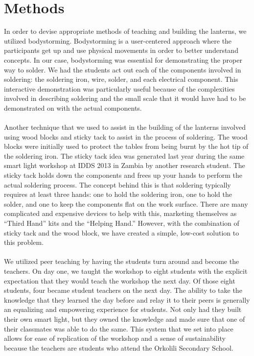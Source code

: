 \documentclass[11pt, twocolumn]{article}
\begin{document}
\section*{Methods}
In order to devise appropriate methods of teaching and building the lanterns, we utilized bodystorming. Bodystorming is a user-centered approach where the participants get up and use physical movements in order to better understand concepts. In our case, bodystorming was essential for demonstrating the proper way to solder. We had the students act out each of the components involved in soldering: the soldering iron, wire, solder, and each electrical component. This interactive demonstration was particularly useful because of the complexities involved in describing soldering and the small scale that it would have had to be demonstrated on with the actual components.\ \\
\ \\
Another technique that we used to assist in the building of the lanterns involved using wood blocks and sticky tack to assist in the process of soldering. The wood blocks were initially used to protect the tables from being burnt by the hot tip of the soldering iron. The sticky tack idea was generated last year during the same smart light workshop at IDDS 2013 in Zambia by another research student. The sticky tack holds down the components and frees up your hands to perform the actual soldering process. The concept behind this is that soldering typically requires at least three hands: one to hold the soldering iron, one to hold the solder, and one to keep the components flat on the work surface. There are many complicated and expensive devices to help with this, marketing themselves as “Third Hand” kits and the “Helping Hand.” However, with the combination of sticky tack and the wood block, we have created a simple, low-cost solution to this problem.\ \\
\ \\
We utilized peer teaching by having the students turn around and become the teachers.  On day one, we taught the workshop to eight students with the explicit expectation that they would teach the workshop the next day. Of those eight students, four became student teachers on the next day. The ability to take the knowledge that they learned the day before and relay it to their peers is generally an equalizing and empowering experience for students. Not only had they built their own smart light, but they owned the knowledge and made sure that one of their classmates was able to do the same. This system that we set into place allows for ease of replication of the workshop and a sense of sustainability because the teachers are students who attend the Orkolili Secondary School.\ \\
\end{document}
